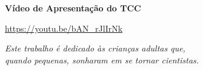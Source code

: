 \documentclass[
12pt,
 a4paper,
    english,
    brazil,
    oneside
    ]{abntex2}
\begin{document}
	
	
	\frenchspacing 
	
	
	\renewcommand{\imprimircapa}{%
		\begin{capa}%
			\center
			{\ABNTEXchapterfont\large\imprimirautor}
			\vspace*{\fill}
			
			{\ABNTEXchapterfont\bfseries\LARGE\imprimirtitulo}
			
			\vspace*{5cm}
			\textbf{Vídeo de Apresentação do TCC}
			
			\href{https://youtu.be/bAN_rJlIrNk}{https://youtu.be/bAN\_rJlIrNk}	
			\vspace*{\fill}
			
			{\large\imprimirlocal}
			\par
			{\large\imprimirdata}
			\vspace*{1cm}
		\end{capa}
	}
	\imprimircapa
	
	\imprimirfolhaderosto
	
	\begin{dedicatoria}
		\vspace*{\fill}
		\centering
		\noindent
		\textit{
			Este trabalho é dedicado às crianças adultas que,\\
			quando pequenas, sonharam em se tornar cientistas.\\
			}
	\end{dedicatoria}
	
\end{document}
